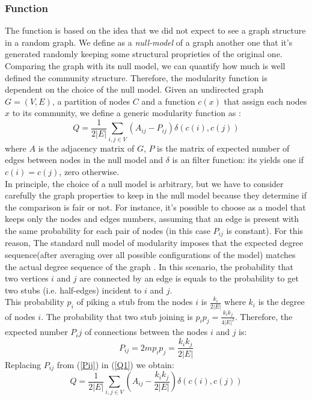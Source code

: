\subsubsection{Function}
The function is based on the idea that we did not expect to see a graph structure in a random graph.
We define as a \textit{null-model} of a graph another one that it's generated randomly keeping some structural proprieties of the original one.
Comparing the graph with its null model, we can quantify how much is well defined the community structure. Therefore, the modularity function is dependent on the choice of the null model. 
Given an undirected graph $G = (V,E)$, a partition of nodes $C$ and a function $c(x)$ that assign each nodes $x$ to its community, we define a generic modularity function as :
\begin{equation}\label{Q1}
Q = \frac{1}{2|E|} \sum_{i,j \in V}(A_{ij} - P_{ij}) \delta(c(i), c(j))
\end{equation}
where $A$ is the  adjacency matrix of $G$, $P$ is the matrix of expected number of edges between nodes in the null model and $\delta$ is an filter function: its yields one if $c(i) = c(j)$, zero otherwise.\\
In principle, the choice of a null model is arbitrary, but we have to consider carefully the graph properties to keep in the null model because they determine if the comparison is fair or not. 
For instance, it's possible to choose as a model that keeps only the nodes and edges numbers, assuming that an edge is present with the same probability for each pair of nodes (in this case $P_{ij}$ is constant). 
For this reason, The standard null model of modularity imposes that the expected degree sequence(after averaging over all possible configurations of the model) matches the actual degree sequence of the graph \cite{fortunato}.
In this scenario, the probability that two vertices $i$ and $j$ are connected by an edge is equals to the probability to get two stubs (i.e. half-edges) incident to $i$ and $j$.\\
This probability $p_i$ of piking a stub from the nodes $i$ is $\frac{k_i}{2|E|}$ where $k_i$ is the degree of nodes $i$. The probability that two stub joining is $p_ip_j = \frac{k_ik_j}{4|E|^2}$. Therefore, the expected number $P_ij$ of connections between the nodes $i$ and $j$ is:
\begin{equation}\label{Pij}
P_{ij} = 2mp_ip_j = \frac{k_ik_j}{2|E|}
\end{equation}
Replacing $P_{ij}$ from (\ref{Pij}) in (\ref{Q1}) we obtain:
\begin{equation}\label{ModularityExt}
Q = \frac{1}{2|E|} \sum_{i,j \in V}\left(A_{ij} - \frac{k_ik_j}{2|E|}\right) \delta(c(i), c(j))
\end{equation}
